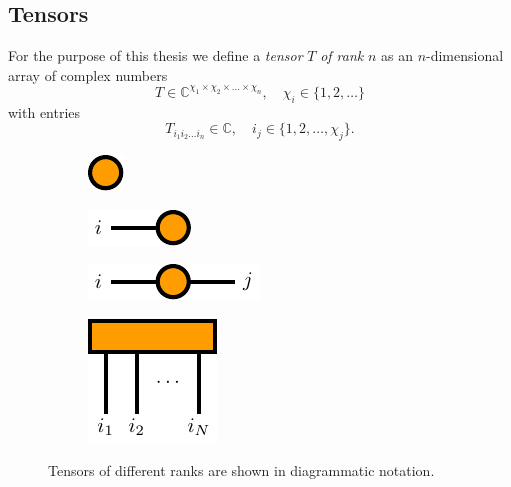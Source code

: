 \subsection*{Tensors}
For the purpose of this thesis we define a \textit{tensor} $T$ \textit{of rank} $n$ as an $n$-dimensional array of complex numbers
\begin{equation}
	T \in \mathbb{C}^{\chi_1\times\chi_2\times\dots\times\chi_n}, \quad \chi_i \in \{1, 2, \dots\}
\end{equation}
with entries
\begin{equation}
	T_{i_1i_2\dots i_n} \in \mathbb{C}, \quad i_j \in \{1, 2, \dots, \chi_j\}.
\end{equation}
\begin{figure}
	\centering
	\begin{subfigure}[c]{0.2\textwidth}
		\centering
		\includegraphics[]{figures/tikz/Tensor_Networks/basic_diagrams/basic_diagrams_a.pdf}
		\caption{}
		\label{fig:basic_tensor_diagrams_scalar}
	\end{subfigure}
	\begin{subfigure}[c]{0.2\textwidth}
		\centering
		\includegraphics[]{figures/tikz/Tensor_Networks/basic_diagrams/basic_diagrams_b.pdf}
		\caption{}
		\label{fig:basic_tensor_diagrams_vector}
	\end{subfigure}
	\begin{subfigure}[c]{0.2\textwidth}
		\centering
		\includegraphics[]{figures/tikz/Tensor_Networks/basic_diagrams/basic_diagrams_c.pdf}
		\caption{}
		\label{fig:basic_tensor_diagrams_matrix}
	\end{subfigure}
	\begin{subfigure}[c]{0.2\textwidth}
		\centering
		\includegraphics[]{figures/tikz/Tensor_Networks/basic_diagrams/basic_diagrams_d.pdf}
		\caption{}
		\label{fig:basic_tensor_diagrams_rank_n_tensor}
	\end{subfigure}
	\caption{Tensors of different ranks are shown in diagrammatic notation.}
	\label{fig:basic_tensor_diagrams}
\end{figure}
